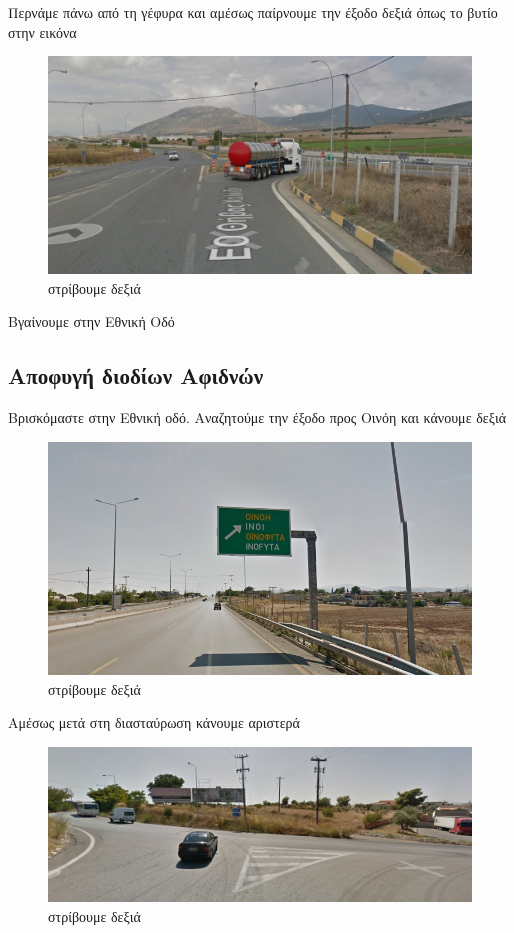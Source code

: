 Περνάμε πάνω από τη γέφυρα και αμέσως παίρνουμε την έξοδο δεξιά όπως το βυτίο στην εικόνα
\begin{figure}[H]
\includegraphics[width=\textwidth]{images/lamia-athina/thiva/thiva_019.jpg} 
\caption{στρίβουμε δεξιά}
\end{figure}
Βγαίνουμε στην Εθνική Οδό
\newpage
\begin{center}
\section*{Αποφυγή διοδίων Αφιδνών}
\end{center}
Βρισκόμαστε στην Εθνική οδό. Αναζητούμε την έξοδο προς Οινόη και κάνουμε δεξιά
\begin{figure}[H]
\includegraphics[width=\textwidth]{images/lamia-athina/afidnon/afidnon_020.jpg} 
\caption{στρίβουμε δεξιά}
\end{figure}
Αμέσως μετά στη διασταύρωση κάνουμε αριστερά
\begin{figure}[H]
\includegraphics[width=\textwidth]{images/lamia-athina/afidnon/afidnon_021.jpg} 
\caption{στρίβουμε δεξιά}
\end{figure}
